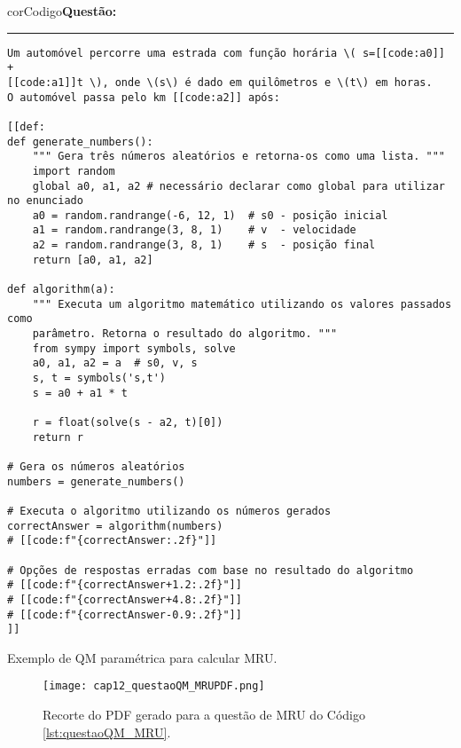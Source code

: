 \begin{listing}[!ht]
\begin{myboxCode}{corCodigo}{\textbf{Questão: }}\vspace{3mm}
\hrule
\begin{verbatim}
Um automóvel percorre uma estrada com função horária \( s=[[code:a0]] + 
[[code:a1]]t \), onde \(s\) é dado em quilômetros e \(t\) em horas. 
O automóvel passa pelo km [[code:a2]] após:

[[def:
def generate_numbers():
    """ Gera três números aleatórios e retorna-os como uma lista. """
    import random
    global a0, a1, a2 # necessário declarar como global para utilizar no enunciado
    a0 = random.randrange(-6, 12, 1)  # s0 - posição inicial
    a1 = random.randrange(3, 8, 1)    # v  - velocidade
    a2 = random.randrange(3, 8, 1)    # s  - posição final
    return [a0, a1, a2]

def algorithm(a):
    """ Executa um algoritmo matemático utilizando os valores passados como 
    parâmetro. Retorna o resultado do algoritmo. """
    from sympy import symbols, solve
    a0, a1, a2 = a  # s0, v, s
    s, t = symbols('s,t')
    s = a0 + a1 * t

    r = float(solve(s - a2, t)[0])
    return r

# Gera os números aleatórios
numbers = generate_numbers()

# Executa o algoritmo utilizando os números gerados
correctAnswer = algorithm(numbers)
# [[code:f"{correctAnswer:.2f}"]]

# Opções de respostas erradas com base no resultado do algoritmo
# [[code:f"{correctAnswer+1.2:.2f}"]]
# [[code:f"{correctAnswer+4.8:.2f}"]]
# [[code:f"{correctAnswer-0.9:.2f}"]]
]]
\end{verbatim}
\end{myboxCode}
\caption{Exemplo de QM paramétrica para calcular MRU.}
\label{lst:questaoQM_MRU}
\end{listing}

\begin{figure}[!ht]
  \texttt{[image: cap12\_questaoQM\_MRUPDF.png]}
  \caption{Recorte do PDF gerado para a questão de MRU do Código \ref{lst:questaoQM_MRU}.}
  \label{fig:cap12_questaoQM_MRUPDF}
\end{figure}



